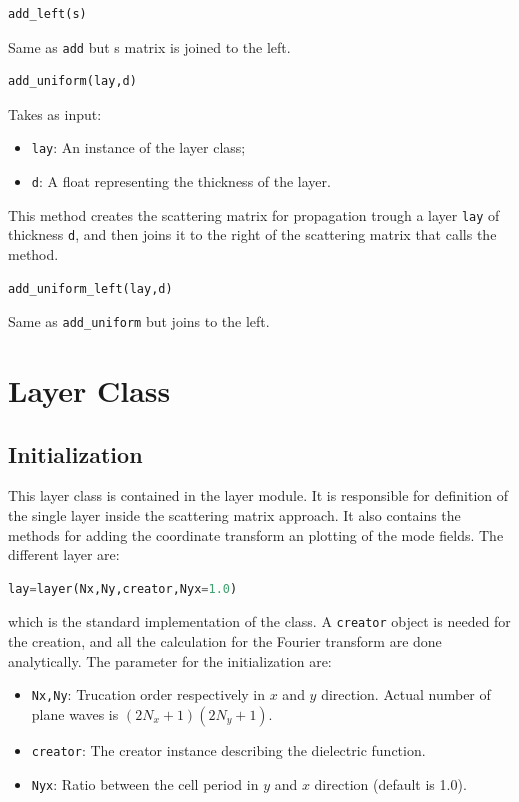 \documentclass[a4paper,10pt]{report}
\begin{document}
\begin{lstlisting}[language=Python,basicstyle=\ttfamily\Large]
add_left(s)
\end{lstlisting}
Same as \texttt{add} but s matrix is joined to the left.

\begin{lstlisting}[language=Python,basicstyle=\ttfamily\Large]
add_uniform(lay,d)
\end{lstlisting}
Takes as input:
\begin{itemize}[noitemsep,topsep=0pt,parsep=0pt,partopsep=0pt]
\item \texttt{lay}: An instance of the layer class;
\item \texttt{d}: A float representing the thickness of the layer.
\end{itemize}
This method creates the scattering matrix for propagation trough a layer \texttt{lay} of thickness \texttt{d}, and then joins it to the right of the scattering matrix that calls the method.

\begin{lstlisting}[language=Python,basicstyle=\ttfamily\Large]
add_uniform_left(lay,d)
\end{lstlisting}
Same as \texttt{add\_uniform} but joins to the left.





\section{Layer Class}
\subsection{Initialization}
This layer class is contained in the layer module. It is responsible for definition of the single layer inside the scattering matrix approach. It also contains the methods for adding the coordinate transform an plotting of the mode fields. The different layer are:
\begin{lstlisting}[language=Python]
lay=layer(Nx,Ny,creator,Nyx=1.0)
\end{lstlisting}
which is the standard implementation of the class. A \texttt{creator} object is needed for the creation, and all the calculation for the Fourier transform are done analytically. The parameter for the initialization are:
\begin{itemize}[noitemsep,topsep=0pt,parsep=0pt,partopsep=0pt]
\item \texttt{Nx,Ny}: Trucation order respectively in $x$ and $y$ direction. Actual number of plane waves is $(2N_x+1)(2N_y+1)$.
\item \texttt{creator}: The creator instance describing the dielectric function.
\item \texttt{Nyx}: Ratio between the cell period in $y$ and $x$ direction (default is 1.0).
\end{itemize}
\end{document}
